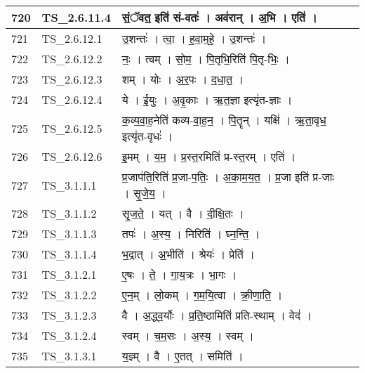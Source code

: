 \documentclass[17pt]{extarticle}
\begin{document}
\begin{longtable}{||p{0.4in}||p{0.9in}||p{4.0in}||p{0.9in}||}
        \hline
            720 & TS\_2.6.11.4 & सं॒ॅवत॒ इति॑ सं{-}वतः॑   ।   अव॑रान्   ।   अ॒भि   ।   एति॑   ।    &      \\
        \hline
            721 & TS\_2.6.12.1 & उ॒शन्तः॑   ।   त्वा॒   ।   ह॒वा॒म॒हे॒   ।   उ॒शन्तः॑   ।    &      \\
        \hline
            722 & TS\_2.6.12.2 & नः॒   ।   त्वम्   ।   सो॒म॒   ।   पि॒तृभि॒रिति॑ पि॒तृ{-}भिः॒   ।    &      \\
        \hline
            723 & TS\_2.6.12.3 & शम्   ।   योः   ।   अ॒र॒पः   ।   द॒धा॒त॒   ।    &      \\
        \hline
            724 & TS\_2.6.12.4 & ये   ।   ई॒युः   ।   अ॒वृ॒काः   ।   ऋ॒त॒ज्ञा इत्यृ॑त{-}ज्ञाः   ।    &      \\
        \hline
            725 & TS\_2.6.12.5 & क॒व्य॒वा॒ह॒नेति॑ कव्य{-}वा॒ह॒न॒   ।   पि॒तॄन्   ।   यक्षि॑   ।   ऋ॒ता॒वृध॒ इत्यृ॑त{-}वृधः॑   ।    &      \\
        \hline
            726 & TS\_2.6.12.6 & इ॒मम्   ।   य॒म॒   ।   प्र॒स्त॒रमिति॑ प्र{-}स्त॒रम्   ।   एति॑   ।    &      \\
        \hline
            727 & TS\_3.1.1.1 & प्र॒जाप॑ति॒रिति॑ प्र॒जा{-}प॒तिः॒   ।   अ॒का॒म॒य॒त॒   ।   प्र॒जा इति॑ प्र{-}जाः   ।   सृ॒जे॒य॒   ।    &      \\
        \hline
            728 & TS\_3.1.1.2 & सृ॒ज॒ते॒   ।   यत्   ।   वै   ।   दी॒क्षि॒तः   ।    &      \\
        \hline
            729 & TS\_3.1.1.3 & तपः॑   ।   अ॒स्य॒   ।   निरिति॑   ।   घ्न॒न्ति॒   ।    &      \\
        \hline
            730 & TS\_3.1.1.4 & भ॒द्रात्   ।   अ॒भीति॑   ।   श्रेयः॑   ।   प्रेति॑   ।    &      \\
        \hline
            731 & TS\_3.1.2.1 & ए॒षः   ।   ते॒   ।   गा॒य॒त्रः   ।   भा॒गः   ।    &      \\
        \hline
            732 & TS\_3.1.2.2 & ए॒न॒म्   ।   लो॒कम्   ।   ग॒म॒यि॒त्वा   ।   क्री॒णा॒ति॒   ।    &      \\
        \hline
            733 & TS\_3.1.2.3 & वै   ।   अ॒द्ध्व॒र्योः   ।   प्र॒ति॒ष्ठामिति॑ प्रति{-}स्थाम्   ।   वेद॑   ।    &      \\
        \hline
            734 & TS\_3.1.2.4 & स्वम्   ।   च॒म॒सः   ।   अ॒स्य॒   ।   स्वम्   ।    &      \\
        \hline
            735 & TS\_3.1.3.1 & य॒ज्ञ्म्   ।   वै   ।   ए॒तत्   ।   समिति॑   ।    &      \\
        \hline

\end{longtable}
\end{document}
